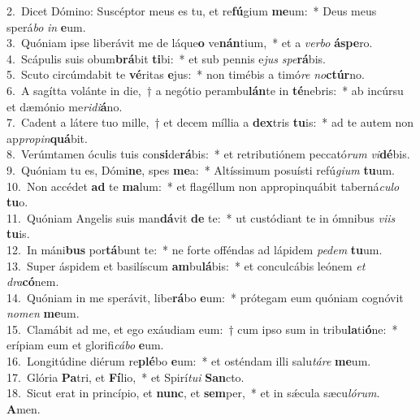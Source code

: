 {2.~}Dicet Dómino: Suscéptor meus es tu, et re\textbf{fú}gium \textbf{me}um:~* Deus meus sperá\textit{bo} \textit{in} \textbf{e}um.\\
{3.~}Quóniam ipse liberávit me de láque\textbf{o} ve\textbf{nán}tium,~* et a \textit{ver}\textit{bo} \textbf{á}\textbf{spe}ro.\\
{4.~}Scápulis suis obum\textbf{brá}bit \textbf{ti}bi:~* et sub pennis e\textit{jus} \textit{spe}\textbf{rá}bis.\\
{5.~}Scuto circúmdabit te \textbf{vé}ritas \textbf{e}jus:~* non timébis a timó\textit{re} \textit{no}\textbf{ctúr}no.\\
{6.~}A sagítta volánte in die,~† a negótio perambu\textbf{lán}te in \textbf{té}nebris:~* ab incúrsu et dæmónio me\textit{ri}\textit{di}\textbf{á}no.\\
{7.~}Cadent a látere tuo mille,~† et decem míllia a \textbf{dex}tris \textbf{tu}is:~* ad te autem non ap\textit{pro}\textit{pin}\textbf{quá}bit.\\
{8.~}Verúmtamen óculis tuis con\textbf{si}de\textbf{rá}bis:~* et retributiónem peccató\textit{rum} \textit{vi}\textbf{dé}bis.\\
{9.~}Quóniam tu es, Dómi\textbf{ne}, spes \textbf{me}a:~* Altíssimum posuísti refú\textit{gi}\textit{um} \textbf{tu}um.\\
{10.~}Non accédet \textbf{ad} te \textbf{ma}lum:~* et flagéllum non appropinquábit taberná\textit{cu}\textit{lo} \textbf{tu}o.\\
{11.~}Quóniam Angelis suis man\textbf{dá}vit \textbf{de} te:~* ut custódiant te in ómnibus \textit{vi}\textit{is} \textbf{tu}is.\\
{12.~}In máni\textbf{bus} por\textbf{tá}bunt te:~* ne forte offéndas ad lápidem \textit{pe}\textit{dem} \textbf{tu}um.\\
{13.~}Super áspidem et basilíscum \textbf{am}bu\textbf{lá}bis:~* et conculcábis leónem \textit{et} \textit{dra}\textbf{có}nem.\\
{14.~}Quóniam in me sperávit, libe\textbf{rá}bo \textbf{e}um:~* prótegam eum quóniam cognóvit \textit{no}\textit{men} \textbf{me}um.\\
{15.~}Clamábit ad me, et ego exáudiam eum:~† cum ipso sum in tribu\textbf{la}ti\textbf{ó}ne:~* erípiam eum et glorifi\textit{cá}\textit{bo} \textbf{e}um.\\
{16.~}Longitúdine diérum re\textbf{plé}bo \textbf{e}um:~* et osténdam illi salu\textit{tá}\textit{re} \textbf{me}um.\\
{17.~}Glória \textbf{Pa}tri, et \textbf{Fí}lio,~* et Spirí\textit{tu}\textit{i} \textbf{San}cto.\\
{18.~}Sicut erat in princípio, et \textbf{nunc}, et \textbf{sem}per,~* et in sǽcula sæcu\textit{ló}\textit{rum}. \textbf{A}men.\\
